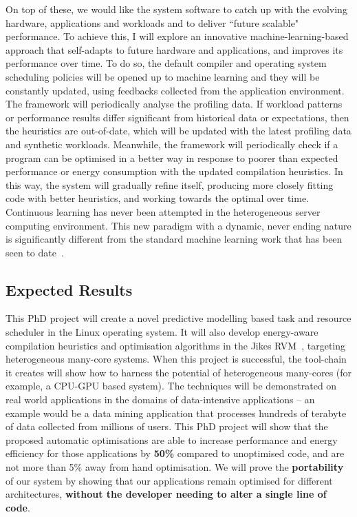 On top of these, we would like the system software to catch up with the evolving hardware,
applications and workloads and to deliver ``future scalable" performance. To achieve this, I will explore an innovative 
machine-learning-based approach that self-adapts to future hardware and applications, and improves its performance over time.
To do so, the default compiler and operating system scheduling policies will be opened up to machine learning and they will be constantly 
updated, using feedbacks collected from the application environment. The framework will periodically analyse the profiling data. If workload 
patterns or performance results differ significant from historical data or expectations, then the heuristics are out-of-date, which will be updated 
with the latest profiling data and synthetic workloads. Meanwhile, the framework will periodically check if a program can be optimised in a 
better way in response to poorer than expected performance or energy consumption with the updated compilation heuristics. 
In this way, the system will gradually refine itself, producing more closely fitting code with better heuristics, and working towards the optimal over time. 
Continuous learning has never been attempted in the heterogeneous server computing environment. This new paradigm 
with a dynamic, never ending nature is significantly different from the standard machine learning work that has been seen to date~\cite{onlineoptimal}.
\subsection{Expected Results}
\begin{shaded}
This PhD project will create a novel predictive modelling based task and resource scheduler in the Linux operating system. It will also develop energy-aware compilation heuristics and optimisation algorithms in the Jikes RVM~\cite{JRVM}, targeting heterogeneous many-core systems.
When this project is successful, the tool-chain it creates will show how to harness the potential of heterogeneous many-cores (for example, a CPU-GPU based system). The techniques will be demonstrated on real world applications in the domains of data-intensive applications -- an example would be a data mining application that processes hundreds of terabyte of data collected from millions of users. This PhD project will show that the proposed automatic optimisations are able to increase performance and energy efficiency for those applications by \textbf{50\%} compared to unoptimised code, and are not more than 5\% away from hand optimisation. We will prove the \textbf{portability} of our system by showing that our applications remain optimised for different architectures, \textbf{without the developer needing to alter a single line of code}.
\end{shaded}

